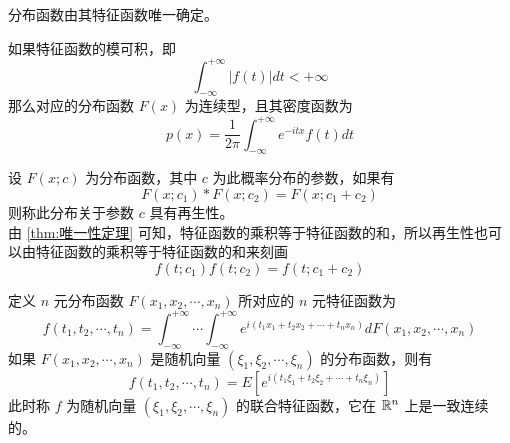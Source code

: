 \documentclass[12pt,a4paper]{amsart}
\begin{document}
\begin{theorem}[唯一性定理]\label{thm:唯一性定理}
    分布函数由其特征函数唯一确定。
\end{theorem}

\begin{theorem}
    如果特征函数的模可积，即
    \begin{equation}
        \int_{-\infty}^{+\infty} |f(t)| dt < +\infty
    \end{equation}
    那么对应的分布函数 $F(x)$ 为连续型，且其密度函数为
    \begin{equation}
        p(x) = \frac{1}{2\pi} \int_{-\infty}^{+\infty} e^{-itx} f(t) dt
    \end{equation}
\end{theorem}

\begin{definition}[再生性]
    设 $F(x;c)$ 为分布函数，其中 $c$ 为此概率分布的参数，如果有
    \begin{equation}
        F(x; c_1) * F(x; c_2) = F(x; c_1+c_2)
    \end{equation}
    则称此分布关于参数 $c$ 具有再生性。 \\
    由 \ref{thm:唯一性定理} 可知，特征函数的乘积等于特征函数的和，所以再生性也可以由特征函数的乘积等于特征函数的和来刻画
    \begin{equation}
        f(t; c_1) f(t; c_2) = f(t; c_1+c_2)
    \end{equation}
\end{definition}

\begin{definition}[多元特征函数]
    定义 $n$ 元分布函数 $F(x_1, x_2, \cdots, x_n)$ 所对应的 $n$ 元特征函数为
    \begin{equation}
        f(t_1, t_2, \cdots, t_n) = \int_{-\infty}^{+\infty} \cdots \int_{-\infty}^{+\infty} e^{i(t_1x_1+t_2x_2+\cdots+t_nx_n)} dF(x_1, x_2, \cdots, x_n)
    \end{equation}
    如果 $F(x_1, x_2, \cdots, x_n)$ 是随机向量 $(\xi_1, \xi_2, \cdots, \xi_n)$ 的分布函数，则有
    \begin{equation}
        f(t_1, t_2, \cdots, t_n) = E\left[e^{i(t_1\xi_1+t_2\xi_2+\cdots+t_n\xi_n)}\right]
    \end{equation}
    此时称 $f$ 为随机向量 $(\xi_1, \xi_2, \cdots, \xi_n)$ 的联合特征函数，它在 $\mathbb{R}^n$ 上是一致连续的。
\end{definition}
\end{document}
